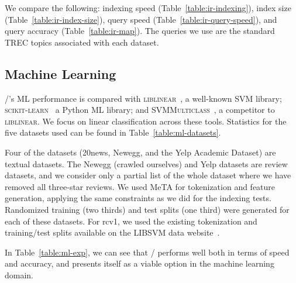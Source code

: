We compare the following: indexing speed (Table~\ref{table:ir-indexing}), index
size (Table~\ref{table:ir-index-size}), query speed
(Table~\ref{table:ir-query-speed}), and query accuracy
(Table~\ref{table:ir-map}). The queries we use are the standard TREC topics
associated with each dataset.







\subsection{Machine Learning}

\meta/'s ML performance is compared with \textsc{liblinear}~\cite{liblinear}, a
well-known SVM library; \textsc{scikit-learn}~\cite{scikit} a Python ML library;
and \textsc{SVMMulticlass}~\cite{svmmulticlass}, a competitor to
\textsc{liblinear}. We focus on linear classification across these tools.
Statistics for the five datasets used can be found in
Table~\ref{table:ml-datasets}.

Four of the datasets (20news\footnotemark[6], Newegg, and the Yelp Academic
Dataset\footnotemark[10]) are textual datasets. The Newegg (crawled ourselves)
and Yelp datasets are review datasets, and we consider only a partial list of
the whole dataset where we have removed all three-star reviews. We used MeTA for
tokenization and feature generation, applying the same constraints as we did for
the indexing tests. Randomized training (two thirds) and test splits (one third)
were generated for each of these datasets. For rcv1, we used the existing
tokenization and training/test splits available on the LIBSVM data
website~\footnotemark[11].


In Table~\ref{table:ml-exp}, we can see that \meta/ performs well both in
terms of speed and accuracy, and presents itself as a viable option in the
machine learning domain.



